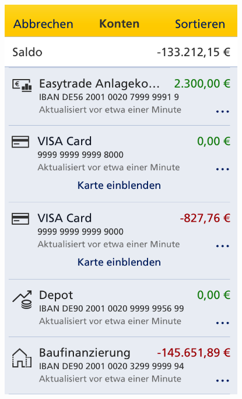 \begin{figure}[H] 
    \begin{minipage}[b]{.5\linewidth}
        \centering\includegraphics[width=0.94\textwidth]{img/screenshots/ex3p1.png}
    \end{minipage}%
    \begin{minipage}[b]{.5\linewidth}

\end{minipage}
\end{figure}
